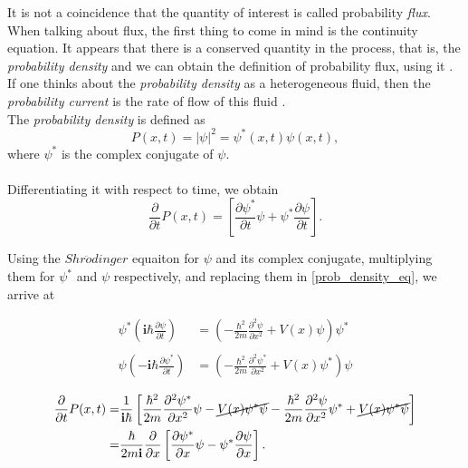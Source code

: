 \documentclass[12pt,a4paper,onecolumn]{article}
\theoremstyle{definition}
\theoremstyle{plain}
\begin{document}
It is not a coincidence that the quantity of interest is called probability \textit{flux}. When talking about flux, the first thing to come in mind is the continuity equation. It appears that there is a conserved quantity in the process, that is, the \textit{probability density} and we can obtain the definition of probability flux, using it \cite{ConservationLaw}. If one thinks about the \textit{probability density} as a heterogeneous fluid, then the \textit{probability current} is the rate of flow of this fluid \cite{wikiProbCurrent}. \\
The \textit{probability density} is defined as
    \begin{equation*}
    P(x,t) = |\psi|^2=\psi^{*}(x,t) \psi(x,t),
    \end{equation*}
    where $\psi^{*}$ is the complex conjugate of $\psi$.\\ \\
    Differentiating it with respect to time, we obtain
    \begin{equation} \label{prob_density_eq}
    \frac{\partial}{\partial t} P(x,t) =
    \left[\frac{\partial \psi^{*}}{\partial  t} \psi +
    \psi^{*} \frac{\partial \psi}{\partial  t} 
    \right].
    \end{equation}
    
    Using the $Shr\ddot{o}dinger$ equaiton for $\psi$ and its complex conjugate, multiplying them for $\psi^{*}$ and $\psi$ respectively, and replacing them in \eqref{prob_density_eq}, we arrive at

\begin{align*}
        \psi^{*}\left(\textbf{i} \hbar \frac{\partial \psi}{\partial t}\right) &= \left(-\frac{\hbar^2}{2m} \frac{\partial^2 \psi}{\partial x^2} + V(x)\psi\right)\psi^{*}\\ \\
        \psi \left(-\textbf{i} \hbar \frac{\partial \psi^{*}}{\partial t}\right) &= \left(-\frac{\hbar^2}{2m} \frac{\partial^2 \psi^{*}}{\partial x^2} + V(x)\psi^{*}\right)\psi
    \end{align*}
  
    \begin{align*}
            \frac{\partial}{\partial t} P(x,t)= &
            \frac{1}{\textbf{i} \hbar}\left[
    \frac{\hbar^2}{2m} \frac{\partial^2 \psi^{*}}{\partial x^2} \psi - \cancel {V(x) \psi^{*}\psi} - 
    \frac{\hbar^2}{2m} \frac{\partial^2 \psi}{\partial x^2} \psi^{*} + 
    \cancel{V(x) \psi^{*} \psi}
    \right] \\
    =&\frac{\hbar}{2m\textbf{i}} \frac{\partial}{\partial x}
    \left[
    \frac{\partial \psi^{*}}{\partial  x} \psi -
    \psi^{*} \frac{\partial \psi}{\partial  x} 
    \right].
    \end{align*}
    
\end{document}
